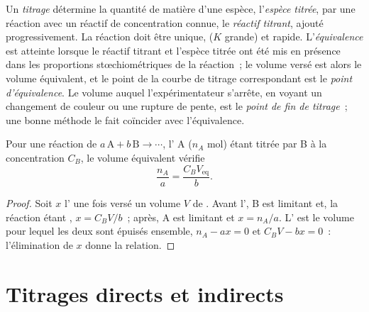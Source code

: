 \begin{definition}\label{def:b1:titration-methods:titration}
Un \emph{titrage} détermine la quantité de matière d'une
espèce, l'\emph{espèce titrée}, par une réaction avec un réactif
de concentration connue, le \emph{réactif titrant}, ajouté
progressivement. La réaction doit être unique,  ($K$ grande)
et rapide. L'\emph{équivalence} est atteinte lorsque le réactif
titrant et l'espèce titrée ont été mis en présence dans les proportions
stœchiométriques de la réaction~; le volume versé est alors le volume
équivalent, et le point de la courbe de titrage correspondant est le
\emph{point d'équivalence}. Le volume auquel l'expérimentateur
s'arrête, en voyant un changement de couleur ou une rupture de pente,
est le \emph{point de fin de titrage}~; une bonne
méthode le fait coïncider avec l'équivalence.
\end{definition}

\begin{proposition}\label{prop:b1:titration-methods:equivalence}
Pour une réaction de  $a\,\mathrm{A} + b\,\mathrm{B} \to \cdots$,
l' A ($n_A$ mol) étant titrée par B à la concentration
$C_B$, le volume équivalent vérifie
\[
  \frac{n_A}{a} = \frac{C_B V_{\mathrm{eq}}}{b} .
\]
\end{proposition}

\begin{proof}
Soit $x$ l' une fois versé un volume $V$ de .
Avant l', B est limitant et, la réaction étant ,
$x = C_BV/b$~; après, A est limitant et $x = n_A/a$. L' est le
volume pour lequel les deux sont épuisés ensemble, $n_A - ax = 0$ et
$C_BV - bx = 0$~: l'élimination de $x$ donne la relation.
\end{proof}

\section{Titrages directs et indirects}

